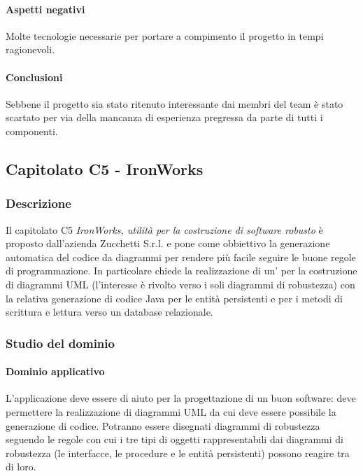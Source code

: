	\paragraph{Aspetti negativi} \Spazio
     Molte tecnologie necessarie per portare a compimento il progetto in tempi ragionevoli.

	\paragraph{Conclusioni} \Spazio
	Sebbene il progetto sia stato ritenuto interessante dai membri del team è stato scartato per via della mancanza di esperienza pregressa da parte di tutti i componenti.
	
	\subsection{Capitolato C5 - IronWorks}
		\subsubsection{Descrizione}
		Il capitolato C5 \emph{IronWorks, utilità per la costruzione di software robusto} è proposto dall'azienda Zucchetti S.r.l. e pone come obbiettivo la generazione automatica del codice da diagrammi  per rendere più facile seguire le buone regole di programmazione. In particolare chiede la realizzazione di un' per la costruzione di diagrammi UML (l'interesse è rivolto verso i soli diagrammi di robustezza) con la relativa generazione di codice Java per le entità persistenti e per i metodi di scrittura e lettura verso un database relazionale. 
		\subsubsection{Studio del dominio}
			\paragraph{Dominio applicativo} \Spazio
			L'applicazione deve essere di aiuto per la progettazione di un buon software: deve permettere la realizzazione di diagrammi UML da cui deve essere possibile la generazione di codice. Potranno essere disegnati diagrammi di robustezza seguendo le regole con cui i tre tipi di oggetti rappresentabili dai diagrammi di robustezza (le interfacce, le procedure e le entità persistenti) possono reagire tra di loro.
